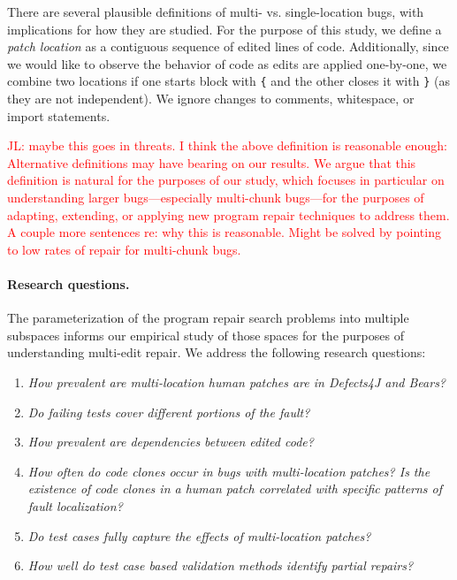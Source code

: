 \documentclass[sigconf, timestamp-false, anonymous=true]{acmart}
\newcommand\todo[1]{\textcolor{red}{#1}}
\begin{document}
There are several plausible definitions of multi- vs. single-location bugs, with
implications for how they are studied. For the purpose of this study, we define
a \emph{patch location} as a contiguous sequence of edited lines of
code. Additionally, since we would like to observe the behavior of code as edits
are applied one-by-one, we combine two locations if one starts block with
\texttt{\{} and the other closes it with \texttt{\}} (as they are not
independent). We ignore changes to comments, whitespace, or import statements.

\todo{JL: maybe this goes in threats. I think the above definition is reasonable
  enough: Alternative definitions may have bearing on our results.  We argue that this
definition is natural for the purposes of our study, which focuses in particular
on understanding larger bugs---especially multi-chunk bugs---for the purposes of 
adapting, extending, or applying new program repair techniques to address them. 
\todo{A couple more sentences re: why this is reasonable. Might be solved by 
pointing to low rates of repair for multi-chunk bugs.}}

\paragraph{Research questions.}  The parameterization of the program repair
search problems into multiple subspaces informs our empirical study of those
spaces for the purposes of understanding multi-edit repair.  We address the
following research questions:

\begin{enumerate}[label=RQ\arabic*:]
\item \emph{How prevalent are multi-location human patches are in Defects4J and Bears?}
\item \emph{Do failing tests cover different portions of the fault?}
\item \emph{How prevalent are dependencies between edited code?}
\item \emph{How often do code clones occur in bugs with multi-location
  patches? Is the existence of code clones in a human patch correlated with specific
  patterns of fault localization?}
\item \emph{Do test cases fully capture the effects of multi-location patches?}
\item \emph{How well do test case based validation methods identify partial repairs?}

\end{enumerate}
\end{document}
